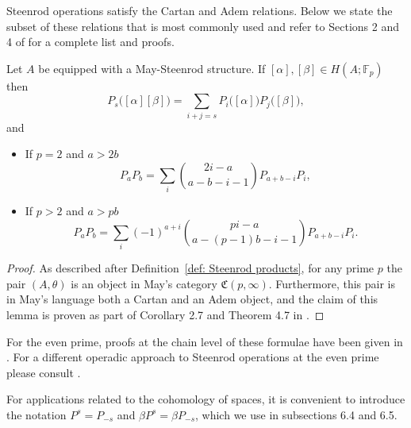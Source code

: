 Steenrod operations satisfy the Cartan and Adem relations.
Below we state the subset of these relations that is most commonly used and refer to Sections 2 and 4 of \cite{may70generalapproach} for a complete list and proofs.
\begin{lemma}
	Let $A$ be equipped with a May-Steenrod structure. If $[\alpha], [\beta] \in H(A;\mathbb{F}_p)$ then
	\begin{equation*}
	P_s\big([\alpha] [\beta]\big) = \sum_{i+j=s} P_i\big( [\alpha] \big) P_j\big( [\beta] \big),
	\end{equation*}
	and
	\begin{itemize}
		\item If $p = 2$ and $a > 2b$
		\begin{equation*}
		P_{a}P_{b} = \sum_i {2i-a \choose a-b-i-1} P_{a+b-i}P_i,
		\end{equation*}
		\item If $p > 2$ and $a > pb$
		\begin{equation*}
		P_{a}P_{b} = \sum_i (-1)^{a+i}{pi-a \choose a-(p-1)b-i-1} P_{a+b-i}P_i.
		\end{equation*}
	\end{itemize}		
\end{lemma}

\begin{proof}
	As described after Definition~\ref{def: Steenrod products}, for any prime $p$ the pair $(A, \theta)$ is an object in May's category $\mathfrak{C}(p, \infty)$.
	Furthermore, this pair is in May's language both a Cartan and an Adem object, and the claim of this lemma is proven as part of Corollary 2.7 and Theorem 4.7 in \cite{may70generalapproach}.
\end{proof}

For the even prime, proofs at the chain level of these formulae have been given in \cite{medina2020cartan,brumfiel2020cochain}. For a different operadic approach to Steenrod operations at the even prime please consult \cite{chataur2005adem-cartan}.

For applications related to the cohomology of spaces, it is convenient to introduce the notation $P^s = P_{-s}$ and $\beta P^s = \beta P_{-s}$, which we use in subsections 6.4 and 6.5.

